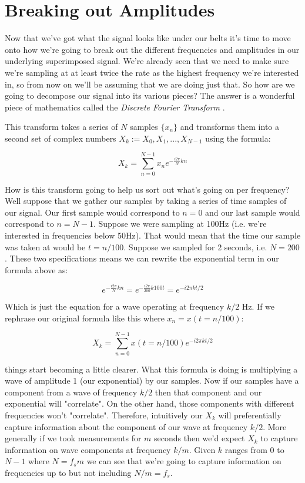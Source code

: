 \documentclass[12pt,a6paper]{book}
\begin{document}
\clearpage
\section{Breaking out Amplitudes}
Now that we've got what the signal looks like under our belts it's time to move onto how we're going to break out the different frequencies and amplitudes in our underlying superimposed signal. We're already seen that we need to make sure we're sampling at at least twice the rate as the highest frequency we're interested in, so from now on we'll be assuming that we are doing just that. So how are we going to decompose our signal into its various pieces? The answer is a wonderful piece of mathematics called the \textit{Discrete Fourier Transform} \cite{dft}.

This transform takes a series of $N$ samples $\{x_n\}$ and transforms them into a second set of complex numbers ${X_k}:=X_0, X_1, ..., X_{N-1}$ using the formula:

\begin{equation}
X_k = \sum_{n=0}^{N-1}x_n e^{-\frac{i2\pi}{N}kn}
\end{equation}

How is this transform going to help us sort out what's going on per frequency? Well suppose that we gather our samples by taking a series of time samples of our signal. Our first sample would correspond to $n=0$ and our last sample would correspond to $n=N-1$. Suppose we were sampling at 100Hz (i.e. we're interested in frequencies below 50Hz). That would mean that the time our sample was taken at would be $t=n/100$. Suppose we sampled for 2 seconds, i.e. $N=200$. These two specifications means we can rewrite the exponential term in our formula above as:

\begin{equation}
e^{-\frac{i2\pi}{N}kn}=e^{-\frac{i2\pi}{200}k100t}=e^{-i2\pi kt/2}
\end{equation}

Which is just the equation for a wave operating at frequency $k/2$ Hz. If we rephrase our original formula like this where $x_n=x(t=n/100)$:

\begin{equation}
X_k = \sum_{n=0}^{N-1}x(t=n/100)e^{-i2\pi kt/2}
\end{equation}

things start becoming a little clearer. What this formula is doing is multiplying a wave of amplitude 1 (our exponential) by our samples. Now if our samples have a component from a wave of frequency $k/2$ then that component and our exponential will "correlate". On the other hand, those components with different frequencies won't "correlate". Therefore, intuitively our $X_k$ will preferentially capture information about the component of our wave at frequency $k/2$. More generally if we took measurements for $m$ seconds then we'd expect $X_k$ to capture information on wave components at frequency $k/m$. Given $k$ ranges from $0$ to $N-1$ where $N=f_s m$ we can see that we're going to capture information on frequencies up to but not including $N/m=f_s$.
\end{document}
